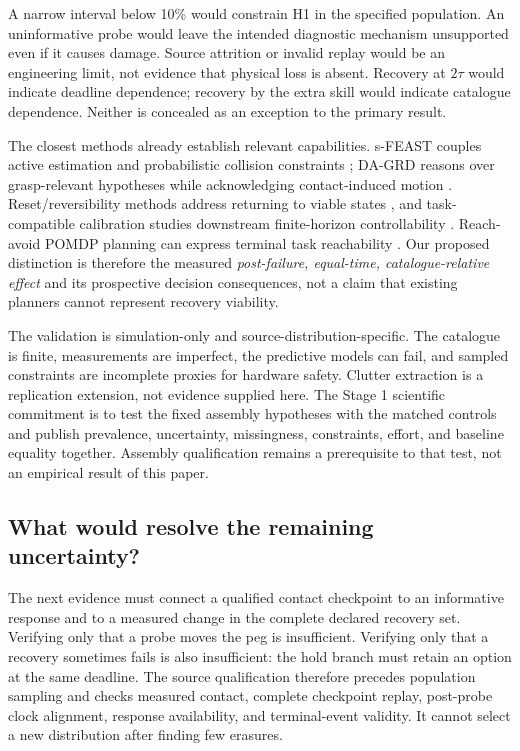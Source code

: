 \documentclass[conference]{IEEEtran}
\begin{document}
A narrow interval below 10\% would constrain H1 in the specified population. An uninformative probe would leave the intended diagnostic mechanism unsupported even if it causes damage. Source attrition or invalid replay would be an engineering limit, not evidence that physical loss is absent. Recovery at $2\tau$ would indicate deadline dependence; recovery by the extra skill would indicate catalogue dependence. Neither is concealed as an exception to the primary result.

The closest methods already establish relevant capabilities. s-FEAST couples active estimation and probabilistic collision constraints \citep{ragan2024}; DA-GRD reasons over grasp-relevant hypotheses while acknowledging contact-induced motion \citep{wang2026}. Reset/reversibility methods address returning to viable states \citep{eysenbach2018,grinsztajn2021}, and task-compatible calibration studies downstream finite-horizon controllability \citep{kobayashi2026}. Reach-avoid POMDP planning can express terminal task reachability \citep{sheng2024}. Our proposed distinction is therefore the measured \emph{post-failure, equal-time, catalogue-relative effect} and its prospective decision consequences, not a claim that existing planners cannot represent recovery viability.

The validation is simulation-only and source-distribution-specific. The catalogue is finite, measurements are imperfect, the predictive models can fail, and sampled constraints are incomplete proxies for hardware safety. Clutter extraction is a replication extension, not evidence supplied here. The Stage 1 scientific commitment is to test the fixed assembly hypotheses with the matched controls and publish prevalence, uncertainty, missingness, constraints, effort, and baseline equality together. Assembly qualification remains a prerequisite to that test, not an empirical result of this paper.

\subsection{What would resolve the remaining uncertainty?}
The next evidence must connect a qualified contact checkpoint to an informative response and to a measured change in the complete declared recovery set. Verifying only that a probe moves the peg is insufficient. Verifying only that a recovery sometimes fails is also insufficient: the hold branch must retain an option at the same deadline. The source qualification therefore precedes population sampling and checks measured contact, complete checkpoint replay, post-probe clock alignment, response availability, and terminal-event validity. It cannot select a new distribution after finding few erasures.
\end{document}
